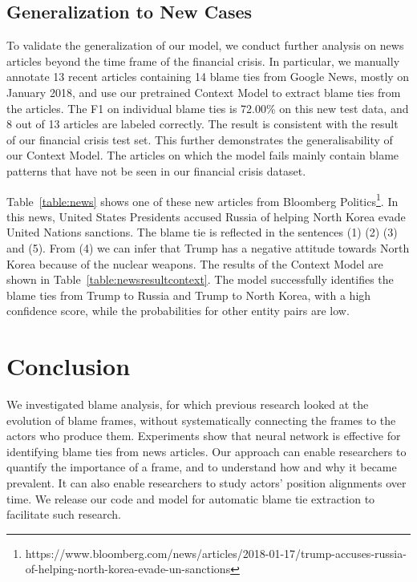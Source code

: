 \documentclass[11pt,a4paper]{article}
\begin{document}
\subsection{Generalization to New Cases}

To validate the generalization of our model, we conduct further analysis on news articles beyond the time frame of the financial crisis. In particular, we manually annotate 13 recent articles containing 14 blame ties from Google News, mostly on January 2018, and use our pretrained Context Model to extract blame ties from the articles. The F1 on individual blame ties is 72.00\% on this new test data, and 8 out of 13 articles are labeled correctly. The result is consistent with the result of our financial crisis test set. This further demonstrates the generalisability of our Context Model. The articles on which the model fails mainly contain blame patterns that have not be seen in our financial crisis dataset.

Table~\ref{table:news} shows one of these new articles from Bloomberg Politics\footnote{https://www.bloomberg.com/news/articles/2018-01-17/trump-accuses-russia-of-helping-north-korea-evade-un-sanctions}. In this news, United States Presidents accused Russia of helping North Korea evade United Nations sanctions. The blame tie is reflected in the sentences (1) (2) (3) and (5). From (4) we can infer that Trump has a negative attitude towards North Korea because of the nuclear weapons. The results of the Context Model are shown in Table~\ref{table:newsresultcontext}. The model successfully identifies the blame ties from Trump to Russia and Trump to North Korea, with a high confidence score, while the probabilities for other entity pairs are low.

\section{Conclusion}

We investigated blame analysis, for which previous research looked at the evolution of blame frames, without systematically connecting the frames to the actors who produce them. Experiments show that neural network is effective for identifying blame ties from news articles.  Our approach can enable researchers to quantify the importance of a frame, and to understand how and why it became prevalent. It can also enable researchers to study actors' position alignments over time. We release our code and model for automatic blame tie extraction to facilitate such research.




\end{document}
